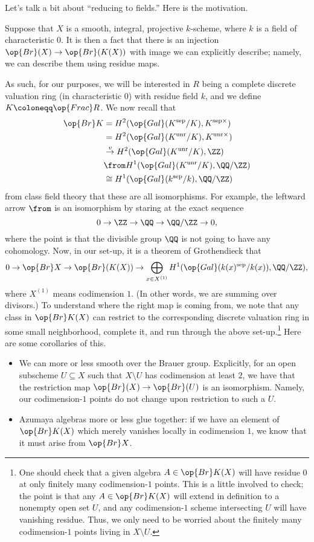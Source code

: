 \documentclass[../notes.tex]{subfiles}
\begin{document}
Let's talk a bit about ``reducing to fields.'' Here is the motivation.
\begin{remark}
	Suppose that $X$ is a smooth, integral, projective $k$-scheme, where $k$ is a field of characteristic $0$. It is then a fact that there is an injection $\op{Br}(X)\to\op{Br}(K(X))$ with image we can explicitly describe; namely, we can describe them using residue maps.
\end{remark}
As such, for our purposes, we will be interested in $R$ being a complete discrete valuation ring (in characteristic $0$) with residue field $k$, and we define $K\coloneqq\op{Frac}R$. We now recall that
\begin{align*}
	\op{Br}K &= H^2(\op{Gal}(K^{\mathrm{sep}}/K),K^{\mathrm{sep}\times}) \\
	&= H^2(\op{Gal}(K^{\mathrm{unr}}/K),K^{\mathrm{unr}\times}) \\
	&\stackrel v\to H^2(\op{Gal}(K^{\mathrm{unr}}/K),\ZZ) \\
	&\from H^1(\op{Gal}(K^{\mathrm{unr}}/K),\QQ/\ZZ) \\
	&\cong H^1(\op{Gal}(k^{\mathrm{sep}}/k),\QQ/\ZZ)
\end{align*}
from class field theory that these are all isomorphisms. For example, the leftward arrow $\from$ is an isomorphism by staring at the exact sequence
\[0\to\ZZ\to\QQ\to\QQ/\ZZ\to0,\]
where the point is that the divisible group $\QQ$ is not going to have any cohomology. Now, in our set-up, it is a theorem of Grothendieck that
\begin{equation}
	0\to\op{Br}X\to\op{Br}(K(X))\to\bigoplus_{x\in X^{(1)}}H^1(\op{Gal}(k(x)^{\mathrm{sep}}/k(x)),\QQ/\ZZ), \label{eq:grothendieck-purity}
\end{equation}
where $X^{(1)}$ means codimension $1$. (In other words, we are summing over divisors.) To understand where the right map is coming from, we note that any class in $\op{Br}K(X)$ can restrict to the corresponding discrete valuation ring in some small neighborhood, complete it, and run through the above set-up.\footnote{One should check that a given algebra $A\in\op{Br}K(X)$ will have residue $0$ at only finitely many codimension-$1$ points. This is a little involved to check; the point is that any $A\in\op{Br}K(X)$ will extend in definition to a nonempty open set $U$, and any codimension-$1$ scheme intersecting $U$ will have vanishing residue. Thus, we only need to be worried about the finitely many codimension-$1$ points living in $X\setminus U$.} Here are some corollaries of this.
\begin{itemize}
	\item We can more or less smooth over the Brauer group. Explicitly, for an open subscheme $U\subseteq X$ such that $X\setminus U$ has codimension at least $2$, we have that the restriction map $\op{Br}(X)\to\op{Br}(U)$ is an isomorphism. Namely, our codimension-$1$ points do not change upon restriction to such a $U$.
	\item Azumaya algebras more or less glue together: if we have an element of $\op{Br}K(X)$ which merely vanishes locally in codimension $1$, we know that it must arise from $\op{Br}X$.
\end{itemize}
\end{document}
